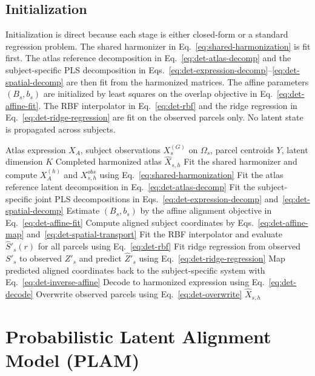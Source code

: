 \documentclass[11pt]{article}
\numberwithin{equation}{section}
\begin{document}
\subsection{Initialization}
Initialization is direct because each stage is either closed-form or a standard
regression problem.  The shared harmonizer in Eq.~\eqref{eq:shared-harmonization} is
fit first.  The atlas reference decomposition in Eq.~\eqref{eq:det-atlas-decomp} and
the subject-specific PLS decomposition in
Eqs.~\eqref{eq:det-expression-decomp}--\eqref{eq:det-spatial-decomp} are then fit
from the harmonized matrices.  The affine parameters $(B_s,b_s)$ are initialized by
least squares on the overlap objective in Eq.~\eqref{eq:det-affine-fit}.  The RBF
interpolator in Eq.~\eqref{eq:det-rbf} and the ridge regression in
Eq.~\eqref{eq:det-ridge-regression} are fit on the observed parcels only.  No latent
state is propagated across subjects.

\begin{algorithm}[H]
\caption{Deterministic alignment for subject $s$}
\begin{algorithmic}[1]
\Require Atlas expression $X_A$, subject observations $X_s^{(G)}$ on $\Omega_s$,
         parcel centroids $Y$, latent dimension $K$
\Ensure Completed harmonized atlas $\hat{X}_{s,h}$
\State Fit the shared harmonizer and compute $X_A^{(h)}$ and $X_{s,h}^{obs}$
       using Eq.~\eqref{eq:shared-harmonization}
\State Fit the atlas reference latent decomposition in Eq.~\eqref{eq:det-atlas-decomp}
\State Fit the subject-specific joint PLS decompositions in
       Eqs.~\eqref{eq:det-expression-decomp} and~\eqref{eq:det-spatial-decomp}
\State Estimate $(B_s,b_s)$ by the affine alignment objective in
       Eq.~\eqref{eq:det-affine-fit}
\State Compute aligned subject coordinates by Eqs.~\eqref{eq:det-affine-map}
       and~\eqref{eq:det-spatial-transport}
\State Fit the RBF interpolator and evaluate $\hat{S}'_s(r)$ for all parcels
       using Eq.~\eqref{eq:det-rbf}
\State Fit ridge regression from observed $S'_s$ to observed $Z'_s$ and predict
       $\hat{Z}'_s$ using Eq.~\eqref{eq:det-ridge-regression}
\State Map predicted aligned coordinates back to the subject-specific system with
       Eq.~\eqref{eq:det-inverse-affine}
\State Decode to harmonized expression using Eq.~\eqref{eq:det-decode}
\State Overwrite observed parcels using Eq.~\eqref{eq:det-overwrite}
\State \Return $\hat{X}_{s,h}$
\end{algorithmic}
\end{algorithm}

\section{Probabilistic Latent Alignment Model (PLAM)}
\end{document}
